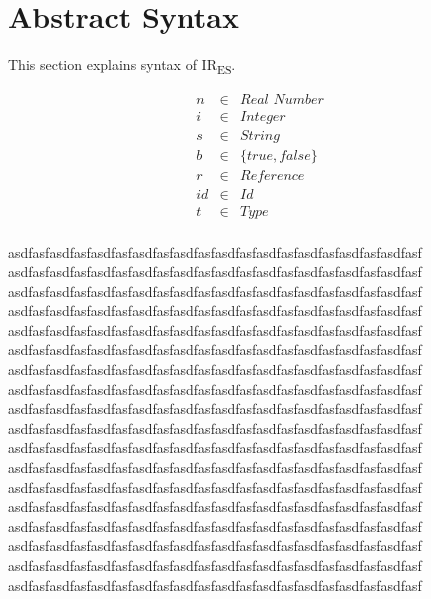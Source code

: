 \documentclass[acmsmall,screen]{acmart}
\newcommand{\irnameb}[0]{\textbf{IR\textsubscript{ES}}\xspace}
\newcommand{\irname}[0]{IR\textsubscript{ES}\xspace}
\begin{document}



\section{Abstract Syntax}

This section explains syntax of \irname.

\[
\begin{array}{rrl}
n & \in & \textit{Real Number} \\
i & \in & \textit{Integer} \\
s & \in & \textit{String} \\
b & \in & \{\textit{true}, \textit{false}\} \\
r & \in & \textit{Reference} \\
id & \in & \textit{Id} \\
t & \in & \textit{Type} \\
\end{array}
\]

asdfasfasdfasfasdfasfasdfasfasdfasfasdfasfasdfasfasdfasfasdfasfasdfasf
asdfasfasdfasfasdfasfasdfasfasdfasfasdfasfasdfasfasdfasfasdfasfasdfasf
asdfasfasdfasfasdfasfasdfasfasdfasfasdfasfasdfasfasdfasfasdfasfasdfasf
asdfasfasdfasfasdfasfasdfasfasdfasfasdfasfasdfasfasdfasfasdfasfasdfasf
asdfasfasdfasfasdfasfasdfasfasdfasfasdfasfasdfasfasdfasfasdfasfasdfasf
asdfasfasdfasfasdfasfasdfasfasdfasfasdfasfasdfasfasdfasfasdfasfasdfasf
asdfasfasdfasfasdfasfasdfasfasdfasfasdfasfasdfasfasdfasfasdfasfasdfasf
asdfasfasdfasfasdfasfasdfasfasdfasfasdfasfasdfasfasdfasfasdfasfasdfasf
asdfasfasdfasfasdfasfasdfasfasdfasfasdfasfasdfasfasdfasfasdfasfasdfasf
asdfasfasdfasfasdfasfasdfasfasdfasfasdfasfasdfasfasdfasfasdfasfasdfasf
asdfasfasdfasfasdfasfasdfasfasdfasfasdfasfasdfasfasdfasfasdfasfasdfasf
asdfasfasdfasfasdfasfasdfasfasdfasfasdfasfasdfasfasdfasfasdfasfasdfasf
asdfasfasdfasfasdfasfasdfasfasdfasfasdfasfasdfasfasdfasfasdfasfasdfasf
asdfasfasdfasfasdfasfasdfasfasdfasfasdfasfasdfasfasdfasfasdfasfasdfasf
asdfasfasdfasfasdfasfasdfasfasdfasfasdfasfasdfasfasdfasfasdfasfasdfasf
asdfasfasdfasfasdfasfasdfasfasdfasfasdfasfasdfasfasdfasfasdfasfasdfasf
asdfasfasdfasfasdfasfasdfasfasdfasfasdfasfasdfasfasdfasfasdfasfasdfasf
asdfasfasdfasfasdfasfasdfasfasdfasfasdfasfasdfasfasdfasfasdfasfasdfasf
\end{document}
